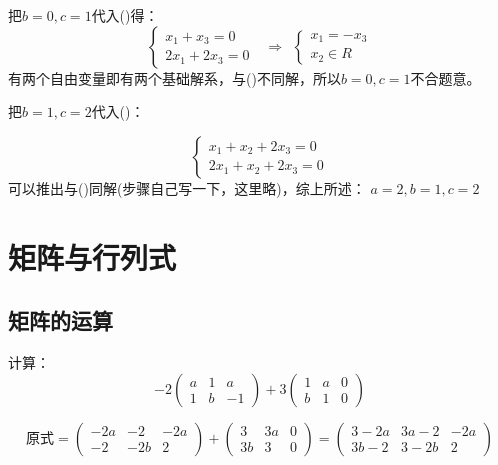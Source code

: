 \documentclass[a4paper]{report}
\begin{document}
\begin{jie}
把$b=0,c=1$代入(\uppercase\expandafter{})得：
\begin{equation*}
\begin{cases}
x_1+x_3=0\\
2x_1+2x_3=0
\end{cases}~~~\Rightarrow~~\begin{cases}
                             x_1=-x_3\\
                             x_2\in R
                           \end{cases}
\end{equation*}
有两个自由变量即有两个基础解系，与(\uppercase\expandafter{})不同解，所以$b=0,c=1$不合题意。

把$b=1,c=2$代入(\uppercase\expandafter{})：

\begin{equation*}
\begin{cases}
x_1+x_2+2x_3=0\\
2x_1+x_2+2x_3=0
\end{cases}
\end{equation*}
可以推出与(\uppercase\expandafter{})同解(步骤自己写一下，这里略)，综上所述：
$a=2,b=1,c=2$
\end{jie}
\chapter{矩阵与行列式}
\section{矩阵的运算}
\EX 计算：
\begin{equation*}
-2
\begin{pmatrix}
a&1&a\\ 1&b&-1
\end{pmatrix}+3
\begin{pmatrix}
1&a&0\\ b&1&0
\end{pmatrix}
\end{equation*}

\begin{jie}
\begin{equation*}
\text{原式}=\begin{pmatrix}
-2a&-2&-2a\\ -2&-2b&2
\end{pmatrix}+\begin{pmatrix}
3&3a&0\\ 3b&3&0
\end{pmatrix}=\begin{pmatrix}
3-2a&3a-2&-2a\\ 3b-2&3-2b&2
\end{pmatrix}
\end{equation*}
\end{jie}
\end{document}
